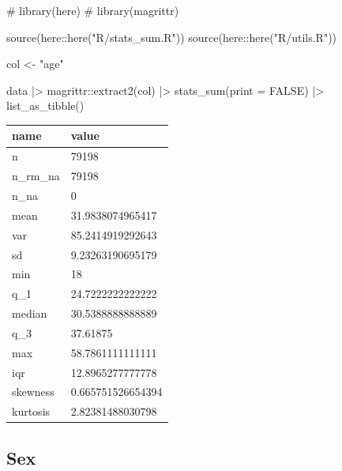 \documentclass[
  12pt,
  a4paper,
  oneside]{tesesusp}
\newenvironment{Shaded}{\begin{snugshade}}{\end{snugshade}}
\newcommand{\AttributeTok}[1]{\textcolor[rgb]{0.40,0.45,0.13}{#1}}
\newcommand{\CommentTok}[1]{\textcolor[rgb]{0.37,0.37,0.37}{#1}}
\newcommand{\ConstantTok}[1]{\textcolor[rgb]{0.56,0.35,0.01}{#1}}
\newcommand{\FunctionTok}[1]{\textcolor[rgb]{0.28,0.35,0.67}{#1}}
\newcommand{\NormalTok}[1]{\textcolor[rgb]{0.00,0.23,0.31}{#1}}
\newcommand{\OtherTok}[1]{\textcolor[rgb]{0.00,0.23,0.31}{#1}}
\newcommand{\SpecialCharTok}[1]{\textcolor[rgb]{0.37,0.37,0.37}{#1}}
\newcommand{\StringTok}[1]{\textcolor[rgb]{0.13,0.47,0.30}{#1}}
\begin{document}
\begin{Shaded}
\begin{Highlighting}[numbers=left,,]
\CommentTok{\# library(here)}
\CommentTok{\# library(magrittr)}

\FunctionTok{source}\NormalTok{(here}\SpecialCharTok{::}\FunctionTok{here}\NormalTok{(}\StringTok{"R/stats\_sum.R"}\NormalTok{))}
\FunctionTok{source}\NormalTok{(here}\SpecialCharTok{::}\FunctionTok{here}\NormalTok{(}\StringTok{"R/utils.R"}\NormalTok{))}

\NormalTok{col }\OtherTok{\textless{}{-}} \StringTok{"age"}

\NormalTok{data }\SpecialCharTok{|\textgreater{}}
\NormalTok{  magrittr}\SpecialCharTok{::}\FunctionTok{extract2}\NormalTok{(col) }\SpecialCharTok{|\textgreater{}}
  \FunctionTok{stats\_sum}\NormalTok{(}\AttributeTok{print =} \ConstantTok{FALSE}\NormalTok{) }\SpecialCharTok{|\textgreater{}}
  \FunctionTok{list\_as\_tibble}\NormalTok{()}
\end{Highlighting}
\end{Shaded}

\begin{table}
\centering
\begin{tabular}{l|l}
\hline
name & value\\
\hline
n & 79198\\
\hline
n\_rm\_na & 79198\\
\hline
n\_na & 0\\
\hline
mean & 31.9838074965417\\
\hline
var & 85.2414919292643\\
\hline
sd & 9.23263190695179\\
\hline
min & 18\\
\hline
q\_1 & 24.7222222222222\\
\hline
median & 30.5388888888889\\
\hline
q\_3 & 37.61875\\
\hline
max & 58.7861111111111\\
\hline
iqr & 12.8965277777778\\
\hline
skewness & 0.665751526654394\\
\hline
kurtosis & 2.82381488030798\\
\hline
\end{tabular}
\end{table}

\hypertarget{sex}{%
\subsection{Sex}\label{sex}}
\end{document}
